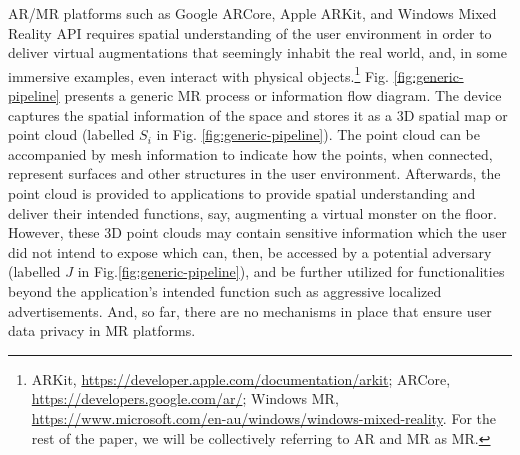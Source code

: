AR/MR platforms such as Google ARCore, %
Apple ARKit, %
and Windows Mixed Reality API %
requires spatial understanding of the user environment in order to deliver virtual augmentations that seemingly inhabit the real world, and, in some immersive examples, even interact with physical objects.\footnote{ARKit, \url{https://developer.apple.com/documentation/arkit};
ARCore, \url{https://developers.google.com/ar/};
Windows MR, \url{https://www.microsoft.com/en-au/windows/windows-mixed-reality}. For the rest of the paper, we will be collectively referring to AR and MR as MR.} Fig. \ref{fig:generic-pipeline} presents a generic MR process or information flow diagram. The device captures the spatial information of the space and stores it as a 3D spatial map or point cloud (labelled $S_i$ in Fig. \ref{fig:generic-pipeline}). The point cloud can be accompanied by mesh information to indicate how the points, when connected, represent surfaces and other structures in the user environment. Afterwards, the point cloud is provided to applications to provide spatial understanding and deliver their intended functions, say, augmenting a virtual monster on the floor. However, these 3D point clouds may contain sensitive information which the user did not intend to expose which can, then, be accessed by a potential adversary (labelled $J$ in Fig.\ref{fig:generic-pipeline}), and be further utilized for functionalities beyond the application's intended function such as aggressive localized advertisements. And, so far, there are no mechanisms in place that ensure user data privacy in MR platforms.%

